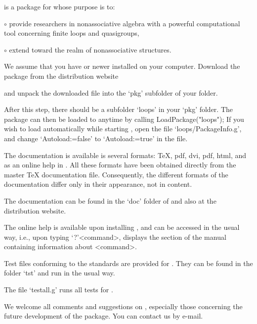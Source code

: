 
{\LOOPS} is a package for  whose purpose is to:
\beginlist%
\item{$\circ$}
    provide researchers in nonassociative algebra with a powerful computational tool
    concerning finite loops and quasigroups,
\item{$\circ$}
    extend {\GAP} toward the realm of nonassociative structures.
\endlist


We assume that you have  or newer installed on your computer.
Download the {\LOOPS} package from the distribution website


and unpack the downloaded file into the `pkg' subfolder of your {\GAP} folder.

After this step, there should be a subfolder `loops' in your `pkg' folder. The
package {\LOOPS} can then be loaded to {\GAP} anytime by calling
\begintt
LoadPackage("loops");
\endtt
If you wish to load {\LOOPS} automatically while starting {\GAP}, open the file
`loops/PackageInfo.g', and change `Autoload:=false' to
`Autoload:=true' in the file.


The documentation is available is several formats: \TeX, pdf, dvi, pdf, html,
and as an online help in {\GAP}. All these formats have been obtained directly
from the master {\TeX} documentation file. Consequently, the different formats
of the documentation differ only in their appearance, not in content.

The documentation can be found in the `doc' folder of {\LOOPS} and also at the
{\LOOPS} distribution website.

The online {\GAP} help is available upon installing {\LOOPS}, and can be
accessed in the usual way, i.e., upon typing `?'<command>, {\GAP} displays the
section of the {\LOOPS} manual containing information about <command>.


Test files conforming to the {\GAP} standards are provided for {\LOOPS}. They
can be found in the folder `tst' and run in the usual way.

The file `testall.g' runs all tests for {\LOOPS}.


We welcome all comments and suggestions on {\LOOPS}, especially those
concerning the future development of the package. You can contact us by e-mail.
